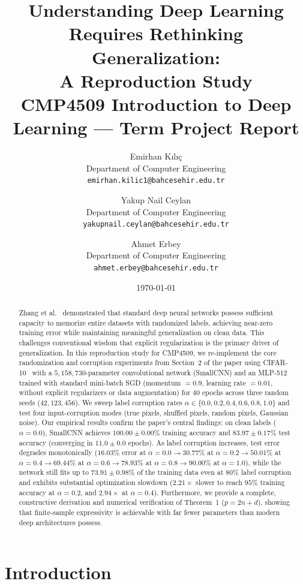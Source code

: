\documentclass[12pt,a4paper]{article}
\title{%
  \textbf{Understanding Deep Learning Requires Rethinking Generalization:}\\
  \large A Reproduction Study\\[0.5em]
  {\normalsize CMP4509 Introduction to Deep Learning --- Term Project Report}
}
\author{
  Emirhan Kılıç\\
  {\small Department of Computer Engineering}\\
  {\small \texttt{emirhan.kilic1@bahcesehir.edu.tr}}
  \and
  Yakup Nail Ceylan\\
  {\small Department of Computer Engineering}\\
  {\small \texttt{yakupnail.ceylan@bahcesehir.edu.tr}}
  \and
  Ahmet Erbey\\
  {\small Department of Computer Engineering}\\
  {\small \texttt{ahmet.erbey@bahcesehir.edu.tr}}
}
\date{\today}
\theoremstyle{definition}
\theoremstyle{remark}
\begin{document}
\maketitle

\begin{abstract}
Zhang et al.~\cite{zhang2017understanding} demonstrated that standard deep
neural networks possess sufficient capacity to memorize entire datasets with
randomized labels, achieving near-zero training error while maintaining
meaningful generalization on clean data. This challenges conventional wisdom
that explicit regularization is the primary driver of generalization. In this
reproduction study for CMP4509, we re-implement the core randomization and
corruption experiments from Section~2 of the paper using CIFAR-10~\cite{krizhevsky2009learning}
with a $5{,}158{,}730$-parameter convolutional network (SmallCNN) and an MLP-512
trained with standard mini-batch SGD (momentum $= 0.9$, learning rate $= 0.01$,
without explicit regularizers or data augmentation) for $40$ epochs across three
random seeds ($42, 123, 456$). We sweep label corruption rates
$\alpha \in \{0.0, 0.2, 0.4, 0.6, 0.8, 1.0\}$ and test four input-corruption
modes (true pixels, shuffled pixels, random pixels, Gaussian noise). Our empirical
results confirm the paper's central findings: on clean labels ($\alpha = 0.0$),
SmallCNN achieves $100.00 \pm 0.00\%$ training accuracy and $83.97 \pm 0.17\%$
test accuracy (converging in $11.0 \pm 0.0$ epochs). As label corruption increases,
test error degrades monotonically ($16.03\%$ error at $\alpha=0.0 \to 30.77\%$ at
$\alpha=0.2 \to 50.01\%$ at $\alpha=0.4 \to 69.44\%$ at $\alpha=0.6 \to 78.93\%$
at $\alpha=0.8 \to 90.00\%$ at $\alpha=1.0$), while the network still fits up to
$73.91 \pm 0.98\%$ of the training data even at $80\%$ label corruption and exhibits
substantial optimization slowdown ($2.21\times$ slower to reach $95\%$ training
accuracy at $\alpha=0.2$, and $2.94\times$ at $\alpha=0.4$). Furthermore, we provide
a complete, constructive derivation and numerical verification of Theorem~1
($p = 2n + d$), showing that finite-sample expressivity is achievable with far
fewer parameters than modern deep architectures possess.
\end{abstract}

\tableofcontents
\clearpage

\section{Introduction}
\label{sec:intro}
\end{document}
